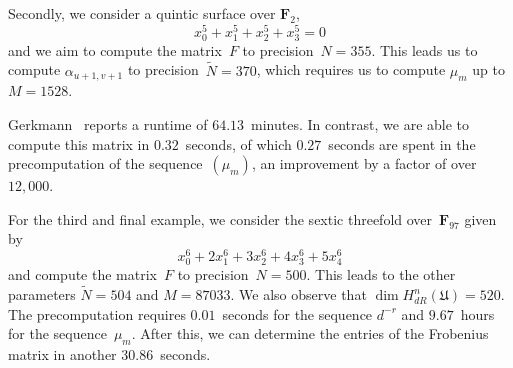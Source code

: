 Secondly, we consider a quintic surface over $\mathbf{F}_2$, 
\begin{equation*}
x_0^5 + x_1^5 + x_2^5 + x_3^5 = 0
\end{equation*}
and we aim to compute the matrix~$F$ to precision~$N = 355$.  This leads 
us to compute $\alpha_{u+1,v+1}$ to precision~$\tilde{N} = 370$, which 
requires us to compute $\mu_{m}$ up to $M = 1528$.

Gerkmann~\citep[Section~7.6]{Gerkmann2007} reports a runtime of 
$64.13$~minutes.  In contrast, we are able to compute this matrix 
in $0.32$~seconds, of which $0.27$~seconds are spent in the precomputation 
of the sequence~$(\mu_m)$, an improvement by a factor of over~$12,000$.

For the third and final example, we consider the sextic threefold 
over~$\mathbf{F}_{97}$ given by 
\begin{equation*}
x_0^6 + 2 x_1^6 + 3 x_2^6 + 4 x_3^6 + 5 x_4^6
\end{equation*}
and compute the matrix~$F$ to precision~$N = 500$.  This leads to the 
other parameters $\tilde{N} = 504$ and $M = 87033$.  We also observe 
that $\dim H_{dR}^{n}(\mathfrak{U}) = 520$.  The precomputation requires 
$0.01$~seconds for the sequence $d^{-r}$ and $9.67$~hours for the 
sequence~$\mu_m$.  After this, we can determine the entries of the 
Frobenius matrix in another $30.86$~seconds.

